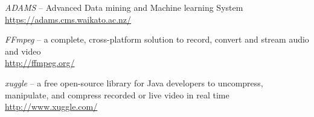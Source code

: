 %

\begin{thebibliography}{999}

		\textit{ADAMS} -- Advanced Data mining and Machine learning System \\
		\url{https://adams.cms.waikato.ac.nz/}{}

		\textit{FFmpeg} -- a complete, cross-platform solution to record,
		convert and stream audio and video \\
		\url{http://ffmpeg.org/}{}

		\textit{xuggle} -- a free open-source library for Java developers
		to uncompress, manipulate, and compress recorded or live video in real time \\
		\url{http://www.xuggle.com/}{}

\end{thebibliography}
